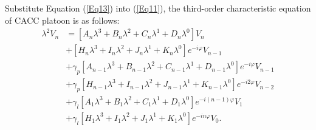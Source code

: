 \documentclass[journal]{IEEEtran}
\begin{document}
Substitute Equation (\ref{Eq13}) into (\ref{Eq11}), the third-order characteristic equation of CACC platoon is as follows:
\begin{equation}
  \begin{aligned}
    \lambda^{2}V_{n}\! & =\!\left[A_{n} \lambda^{3}\!+\!B_{n} \lambda^{2}\!+\!C_{n} \lambda^{1}\!+\!D_{n} \lambda^{0}\right]V_{n}\!                       \\
                       & +\!\left[H_{n} \lambda^{3}\!+\!I_{n} \lambda^{2}\!+\!J_{n} \lambda^{1}\!+\!K_{n} \lambda^{0}\right] e^{-i \varphi} V_{n-1}       \\
                       & +\gamma_{p}\left[A_{n-1} \lambda^{3}+B_{n-1} \lambda^{2}+C_{n-1} \lambda^{1}+D_{n-1} \lambda^{0}\right] e^{-i \varphi} V_{n-1}   \\
                       & +\gamma_{p}\left[H_{n-1} \lambda^{3}+I_{n-1} \lambda^{2}+J_{n-1} \lambda^{1}+K_{n-1} \lambda^{0}\right] e^{-i 2 \varphi} V_{n-2} \\
                       & +\gamma_{l}\left[A_{1} \lambda^{3}+B_{1} \lambda^{2}+C_{1} \lambda^{1}+D_{1} \lambda^{0}\right] e^{-i(n-1) \varphi} V_{1}        \\
                       & +\gamma_{l}\left[H_{1} \lambda^{3}+I_{1} \lambda^{2}+J_{1} \lambda^{1}+K_{1} \lambda^{0}\right] e^{-i n \varphi}V_{0}.
  \end{aligned}
  \label{Eq14}
\end{equation}
\end{document}

